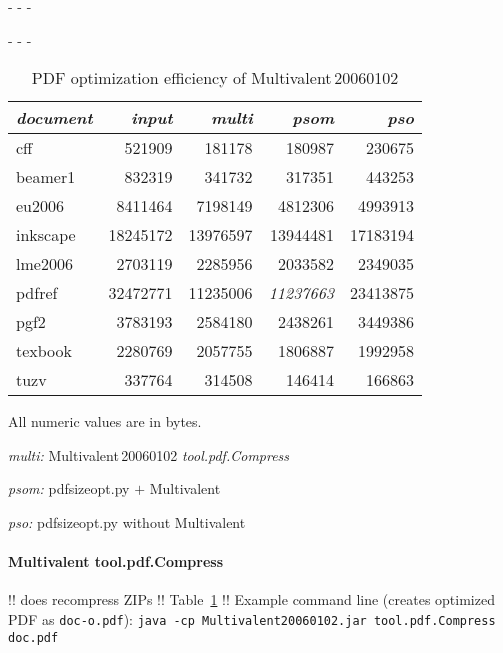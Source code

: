 \documentclass{ltugproc}
\def\cmd{\textsf}
\def\captiontop#1{%
  \advance\abovecaptionskip-\belowcaptionskip
  \advance\belowcaptionskip\abovecaptionskip
  \advance\abovecaptionskip-\belowcaptionskip
  \abovecaptionskip-\abovecaptionskip
  \caption{#1}%
  \advance\abovecaptionskip-\belowcaptionskip
  \advance\belowcaptionskip\abovecaptionskip
  \advance\abovecaptionskip-\belowcaptionskip
  \abovecaptionskip-\abovecaptionskip
}
\begin{document}
\begin{table}
\captiontop{PDF optimization efficiency
of Multivalent\,20060102}\label{tab:eff-multivalent}
\par\small\noindent\hfil
\advance\tabcolsep-2pt  %
\begin{tabular}{@{}lrrrr@{}}
\toprule
\emph{document} & \emph{input} & \emph{multi} & \emph{psom} & \emph{pso} \\\midrule
cff         &   521909 &    181178 &    180987 &   230675 \\
beamer1     &   832319 &    341732 &    317351 &   443253 \\
eu2006      &  8411464 &   7198149 &   4812306 &  4993913 \\
inkscape    & 18245172 &  13976597 &  13944481 & 17183194 \\
lme2006     &  2703119 &   2285956 &   2033582 &  2349035 \\
pdfref      & 32472771 &  11235006 &  \emph{11237663} & 23413875 \\
pgf2        &  3783193 &   2584180 &   2438261 &  3449386 \\
texbook     &  2280769 &   2057755 &   1806887 &  1992958 \\
tuzv        &   337764 &    314508 &    146414 &   166863 \\
\bottomrule
\end{tabular}
\par\bigskip
\par\noindent All numeric values are in bytes.
\par\noindent\emph{multi:} Multivalent\,20060102 \emph{tool.pdf.Compress}
\par\noindent\emph{psom:} \cmd{pdfsizeopt.py} $+$ Multivalent
\par\noindent\emph{pso:} \cmd{pdfsizeopt.py} without Multivalent
\end{table}


\paragraph{Multivalent tool.pdf.Compress}

!! does recompress ZIPs
!! Table~\ref{tab:eff-multivalent}
!! Example command line (creates optimized PDF as \texttt{doc-o.pdf}):
\texttt{java -cp Multivalent20060102.jar tool.pdf.Compress doc.pdf}
\end{document}

